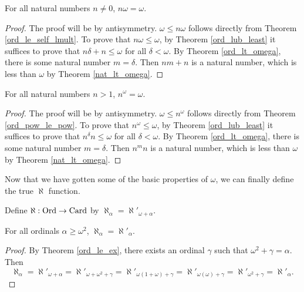 \documentclass[../../math.tex]{subfiles}
\begin{document}
\begin{theorem} \label{nat_mult_omega}
    For all natural numbers $n \neq 0$, $n\omega = \omega$.
\end{theorem}
\begin{proof}
    The proof will be by antisymmetry.  $\omega \leq n \omega$ follows directly
    from Theorem \ref{ord_le_self_lmult}.  To prove that $n\omega \leq \omega$,
    by Theorem \ref{ord_lub_least} it suffices to prove that $n \delta + n \leq
    \omega$ for all $\delta < \omega$.  By Theorem \ref{ord_lt_omega}, there is
    some natural number $m = \delta$.  Then $nm + n$ is a natural number, which
    is less than $\omega$ by Theorem \ref{nat_lt_omega}.
\end{proof}

\begin{theorem} \label{nat_pow_omega}
    For all natural numbers $n > 1$, $n^\omega = \omega$.
\end{theorem}
\begin{proof}
    The proof will be by antisymmetry.  $\omega \leq n^\omega$ follows directly
    from Theorem \ref{ord_pow_le_pow}.  To prove that $n^\omega \leq \omega$,
    by Theorem \ref{ord_lub_least} it suffices to prove that $n^\delta n \leq
    \omega$ for all $\delta < \omega$.  By Theorem \ref{ord_lt_omega}, there is
    some natural number $m = \delta$.  Then $n^m n$ is a natural number, which
    is less than $\omega$ by Theorem \ref{nat_lt_omega}.
\end{proof}

Now that we have gotten some of the basic properties of $\omega$, we can finally
define the true $\aleph$ function.

\begin{definition}
    Define $\aleph : \operatorname{Ord} \to \operatorname{Card}$ by $\aleph_\alpha = \aleph'_{\omega +
    \alpha}$.
\end{definition}

\begin{theorem}
    For all ordinals $\alpha \geq \omega^2$, $\aleph_\alpha = \aleph'_\alpha$.
\end{theorem}
\begin{proof}
    By Theorem \ref{ord_le_ex}, there exists an ordinal $\gamma$ such that
    $\omega^2 + \gamma = \alpha$.  Then
    \[
        \aleph_\alpha
        = \aleph'_{\omega + \alpha}
        = \aleph'_{\omega + \omega^2 + \gamma}
        = \aleph'_{\omega(1 + \omega) + \gamma}
        = \aleph'_{\omega(\omega) + \gamma}
        = \aleph'_{\omega^2 + \gamma}
        = \aleph'_{\alpha}.
    \]
\end{proof}
\end{document}
